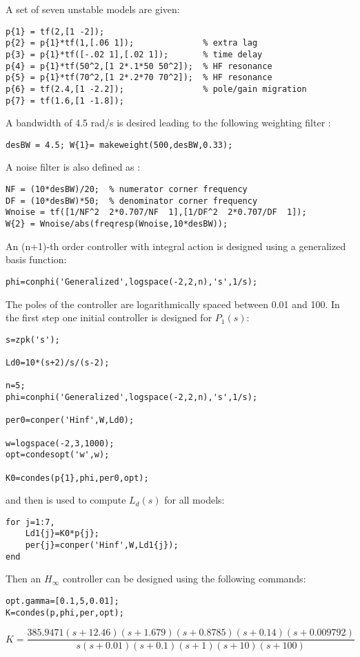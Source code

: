 \documentclass [12pt , a4paper] {report}
\begin{document}
A set of seven unstable models are given:
\begin{lstlisting} 
p{1} = tf(2,[1 -2]);
p{2} = p{1}*tf(1,[.06 1]);              % extra lag
p{3} = p{1}*tf([-.02 1],[.02 1]);       % time delay
p{4} = p{1}*tf(50^2,[1 2*.1*50 50^2]);  % HF resonance
p{5} = p{1}*tf(70^2,[1 2*.2*70 70^2]);  % HF resonance
p{6} = tf(2.4,[1 -2.2]);                % pole/gain migration
p{7} = tf(1.6,[1 -1.8]); 
\end{lstlisting}
A bandwidth of 4.5 rad/s is desired leading  to the following weighting filter :

\begin{lstlisting}
desBW = 4.5; W{1}= makeweight(500,desBW,0.33);
\end{lstlisting}
A noise filter is also defined as :
\begin{lstlisting}
NF = (10*desBW)/20;  % numerator corner frequency
DF = (10*desBW)*50;  % denominator corner frequency
Wnoise = tf([1/NF^2  2*0.707/NF  1],[1/DF^2  2*0.707/DF  1]);
W{2} = Wnoise/abs(freqresp(Wnoise,10*desBW));
\end{lstlisting}
An (n+1)-th order controller with integral action is designed using a generalized basis function:

\begin{lstlisting}
phi=conphi('Generalized',logspace(-2,2,n),'s',1/s);
\end{lstlisting}
The poles of the controller are logarithmically spaced between 0.01 and 100. In the first step one initial controller is designed for $P_1(s)$: 
\begin{lstlisting}
s=zpk('s');

Ld0=10*(s+2)/s/(s-2);

n=5;
phi=conphi('Generalized',logspace(-2,2,n),'s',1/s);

per0=conper('Hinf',W,Ld0);

w=logspace(-2,3,1000);
opt=condesopt('w',w);

K0=condes(p{1},phi,per0,opt);
\end{lstlisting}
and then is used to compute $L_d(s)$ for all models:
\begin{lstlisting}
for j=1:7,    
    Ld1{j}=K0*p{j};
    per{j}=conper('Hinf',W,Ld1{j});
end
\end{lstlisting}
Then an $H_\infty$ controller can be designed using the following commands:
\begin{lstlisting}
opt.gamma=[0.1,5,0.01];
K=condes(p,phi,per,opt);  
\end{lstlisting}
$$K= \frac{385.9471 (s+12.46) (s+1.679) (s+0.8785) (s+0.14) (s+0.009792)}{s (s+0.01) (s+0.1) (s+1) (s+10) (s+100) }$$
               
\end{document}
